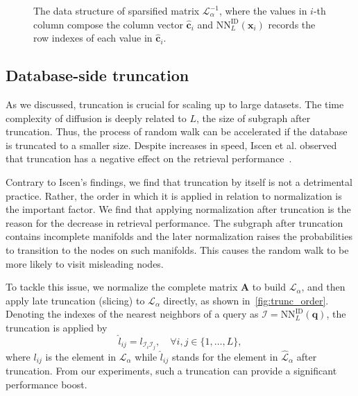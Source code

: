 \documentclass[letterpaper]{article} \usepackage{aaai19}  \usepackage{times}  \usepackage{helvet}  \usepackage{courier}  \usepackage{url}  \usepackage{graphicx}  \frenchspacing  \setlength{\pdfpagewidth}{8.5in}  \setlength{\pdfpageheight}{11in}
\begin{document}
\begin{figure}[t]
\caption{The data structure of sparsified matrix $\mathcal{L}_\alpha^{-1}$, where the values in $i$-th column compose the column vector $\hat{\mathbf{c}}_i$ and $\textrm{NN}^{\textrm{ID}}_L(\mathbf{x}_i)$ records the row indexes of each value in $\hat{\mathbf{c}}_i$.
}
\label{fig:lap_inverse}
\vspace{-3mm}
\end{figure}


\subsection{Database-side truncation}

As we discussed, truncation is crucial for scaling up to large datasets.
The time complexity of diffusion is deeply related to $L$, the size of subgraph after truncation.
Thus, the process of random walk can be accelerated if the database is truncated to a smaller size.
Despite increases in speed, Iscen et al. observed that truncation has a negative effect on the retrieval performance~\cite{iscen2017efficient}.



Contrary to Iscen's findings, we find that truncation by itself is not a detrimental practice.
Rather, the order in which it is applied in relation to normalization is the important factor.
We find that applying normalization after truncation is the reason for the decrease in retrieval performance.
The subgraph after truncation contains incomplete manifolds and the later normalization raises the probabilities to transition to the nodes on such manifolds.
This causes the random walk to be more likely to visit misleading nodes.


To tackle this issue, we normalize the complete matrix $\mathbf{A}$ to build $\mathcal{L}_\alpha$, and then apply late truncation (slicing) to $\mathcal{L}_\alpha$ directly, as shown in~\cref{fig:trunc_order}.
Denoting the indexes of the nearest neighbors of a query as $\mathcal{I}=\textrm{NN}^{\textrm{ID}}_L(\mathbf{q})$, the truncation is applied by
\begin{equation}
\label{equ:truncation}
\hat{l}_{ij} = l_{\mathcal{I}_i \mathcal{I}_j}, \quad \forall i,j \in \{1,\dots,L\},
\end{equation}
where $l_{ij}$ is the element in $\mathcal{L}_\alpha$ while $\hat{l}_{ij}$ stands for the element in $\hat{\mathcal{L}}_\alpha$ after truncation.
From our experiments, such a truncation can provide a significant performance boost.
\end{document}
